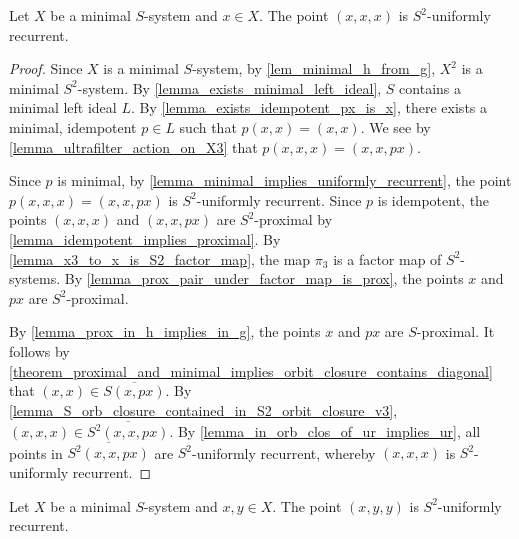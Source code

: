 \begin{theorem}
\label{thm_xxx_is_trtl_unif_rec_v3}
\leanok{}
    Let $X$ be a minimal $S$-system and $x \in X$.  The point $(x,x,x)$ is $S^2$-uniformly recurrent.
\end{theorem}

\begin{proof}
    \leanok{}
Since $X$ is a minimal $S$-system, by \cref{lem_minimal_h_from_g}, $X^2$ is a minimal $S^2$-system.  By \cref{lemma_exists_minimal_left_ideal}, $S$ contains a minimal left ideal $L$. By \cref{lemma_exists_idempotent_px_is_x}, there exists a minimal, idempotent $p \in L$ such that $p(x,x) = (x,x)$.  We see by \cref{lemma_ultrafilter_action_on_X3} that $p(x,x,x) = (x,x,p x)$.

Since $p$ is minimal, by \cref{lemma_minimal_implies_uniformly_recurrent}, the point $p(x,x,x) = (x,x,px)$ is $S^2$-uniformly recurrent.  Since $p$ is idempotent, the points $(x,x,x)$ and $(x,x,px)$ are $S^2$-proximal by \cref{lemma_idempotent_implies_proximal}.  By \cref{lemma_x3_to_x_is_S2_factor_map}, the map $\pi_3$ is a factor map of $S^2$-systems.  By \cref{lemma_prox_pair_under_factor_map_is_prox}, the points $x$ and $px$ are $S^2$-proximal.

By \cref{lemma_prox_in_h_implies_in_g}, the points $x$ and $px$ are $S$-proximal.  It follows by \cref{theorem_proximal_and_minimal_implies_orbit_closure_contains_diagonal} that $(x,x) \in \overline{S(x,px)}$. By \cref{lemma_S_orb_closure_contained_in_S2_orbit_closure_v3}, $(x,x,x) \in \overline{S^2(x,x,px)}$.  By \cref{lemma_in_orb_clos_of_ur_implies_ur}, all points in $\overline{S^2(x,x,px)}$ are $S^2$-uniformly recurrent, whereby $(x,x,x)$ is $S^2$-uniformly recurrent.
\end{proof}

\begin{theorem}
\label{thm_xyy_is_trtl_unif_rec_v3}
\leanok{}
    Let $X$ be a minimal $S$-system and $x, y \in X$.  The point $(x,y,y)$ is $S^2$-uniformly recurrent.
\end{theorem}

